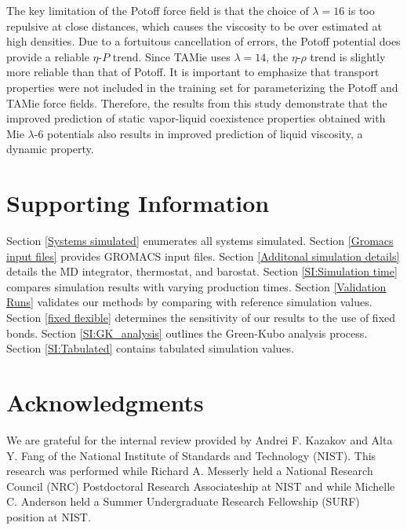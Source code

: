 \documentclass[preprint,review,12pt]{elsarticle}
\begin{document}
	The key limitation of the Potoff force field is that the choice of $\lambda = 16$ is too repulsive at close distances, which causes the viscosity to be over estimated at high densities. Due to a fortuitous cancellation of errors, the Potoff potential does provide a reliable $\eta$-$P$ trend. Since TAMie uses $\lambda =14$, the $\eta$-$\rho$ trend is slightly more reliable than that of Potoff. It is important to emphasize that transport properties were not included in the training set for parameterizing the Potoff and TAMie force fields. Therefore, the results from this study demonstrate that the improved prediction of static vapor-liquid coexistence properties obtained with Mie $\lambda$-6 potentials also results in improved prediction of liquid viscosity, a dynamic property.
	
	
	\section*{Supporting Information}
	
	Section \ref{Systems simulated} enumerates all systems simulated. Section \ref{Gromacs input files} provides GROMACS input files. Section \ref{Additonal simulation details} details the MD integrator, thermostat, and barostat. Section \ref{SI:Simulation time} compares simulation results with varying production times. Section \ref{Validation Runs} validates our methods by comparing with reference simulation values. Section \ref{fixed flexible} determines the sensitivity of our results to the use of fixed bonds. Section \ref{SI:GK_analysis} outlines the Green-Kubo analysis process. Section \ref{SI:Tabulated} contains tabulated simulation values.       
	
	\section*{Acknowledgments}
	
	We are grateful for the internal review provided by Andrei F. Kazakov and Alta Y. Fang of the National Institute of Standards and Technology (NIST). This research was performed while Richard A. Messerly held a National Research Council (NRC) Postdoctoral Research Associateship at NIST and while Michelle C. Anderson held a Summer Undergraduate Research Fellowship (SURF) position at NIST.
	
	
	
		
\end{document}
